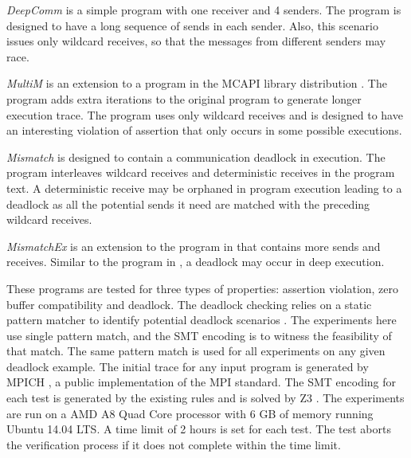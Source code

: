 \begin{compactitem}
\item \textit{DeepComm} is a simple program with one receiver and 4 senders. The program is designed to have a long sequence of sends in each sender.
Also, this scenario issues only wildcard receives, so that the messages from different senders may race.

\item \textit{MultiM} is an extension to a program in the MCAPI library distribution \cite{DBLP:conf/kbse/HuangMM13}. The program adds extra iterations to the original program to generate longer execution trace. The program uses only wildcard receives and is designed to have an interesting violation of assertion that only occurs in some possible executions.

\item \textit{Mismatch} is designed to contain a communication deadlock in execution. The program interleaves wildcard receives and deterministic receives in the program text. A deterministic receive may be orphaned in program execution leading to a deadlock as all the potential sends it need are matched with the preceding wildcard receives. 

\item \textit{MismatchEx} is an extension to the program in  that contains more sends and receives. Similar to the program in , a deadlock may occur in deep execution. 
\end{compactitem}


These programs are tested for three types of properties: assertion violation, zero buffer compatibility and deadlock. 
The deadlock checking relies on a static pattern matcher to identify potential deadlock scenarios \cite{deadlock-draft}. 
The experiments here use single pattern match, and the SMT encoding is to witness the feasibility of that match. The same pattern match is used for all experiments on any given deadlock example. 
The initial trace for any input program is generated by MPICH \cite{mpich}, a public implementation of the MPI standard.
The SMT encoding for each test is generated by the existing rules \cite{DBLP:conf/kbse/HuangMM13,HuangNFM15} and is solved by Z3 \cite{demoura:tacas08}. 
The experiments are run on a AMD A8 Quad Core processor with 6 GB of memory running Ubuntu 14.04 LTS. 
A time limit of 2 hours is set for each test. The test aborts the verification process if it does not complete within the time limit.

